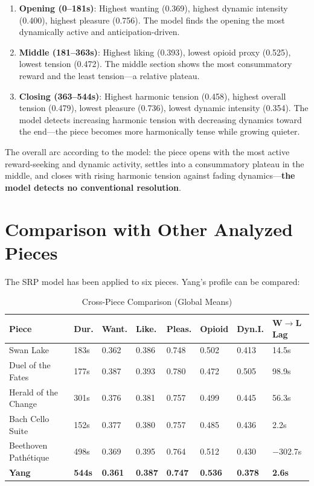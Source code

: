 \documentclass[11pt]{article}
\begin{document}
\begin{enumerate}
    \item \textbf{Opening (0--181s)}: Highest wanting (0.369), highest dynamic intensity (0.400), highest pleasure (0.756). The model finds the opening the most dynamically active and anticipation-driven.

    \item \textbf{Middle (181--363s)}: Highest liking (0.393), lowest opioid proxy (0.525), lowest tension (0.472). The middle section shows the most consummatory reward and the least tension---a relative plateau.

    \item \textbf{Closing (363--544s)}: Highest harmonic tension (0.458), highest overall tension (0.479), lowest pleasure (0.736), lowest dynamic intensity (0.354). The model detects increasing harmonic tension with decreasing dynamics toward the end---the piece becomes more harmonically tense while growing quieter.
\end{enumerate}

The overall arc according to the model: the piece opens with the most active reward-seeking and dynamic activity, settles into a consummatory plateau in the middle, and closes with rising harmonic tension against fading dynamics---\textbf{the model detects no conventional resolution}.

\section{Comparison with Other Analyzed Pieces}
\label{sec:comparison}

The SRP model has been applied to six pieces. Yang's profile can be compared:

\begin{table}[H]
\centering
\caption{Cross-Piece Comparison (Global Means)}
\small
\begin{tabular}{l R{1cm} R{1cm} R{1cm} R{1cm} R{1cm} R{1cm} R{1.2cm}}
\toprule
\textbf{Piece} & \textbf{Dur.} & \textbf{Want.} & \textbf{Like.} & \textbf{Pleas.} & \textbf{Opioid} & \textbf{Dyn.I.} & \textbf{W$\rightarrow$L Lag} \\
\midrule
Swan Lake & 183s & 0.362 & 0.386 & 0.748 & 0.502 & 0.413 & 14.5s \\
Duel of the Fates & 177s & 0.387 & 0.393 & 0.780 & 0.472 & 0.505 & 98.9s \\
Herald of the Change & 301s & 0.376 & 0.381 & 0.757 & 0.499 & 0.445 & 56.3s \\
Bach Cello Suite & 152s & 0.377 & 0.380 & 0.757 & 0.485 & 0.436 & 2.2s \\
Beethoven Path\'{e}tique & 498s & 0.369 & 0.395 & 0.764 & 0.512 & 0.430 & $-$302.7s \\
 \textbf{Yang} & \textbf{544s} & \textbf{0.361} & \textbf{0.387} & \textbf{0.747} & \textbf{0.536} & \textbf{0.378} & \textbf{2.6s} \\
\bottomrule
\end{tabular}
\end{table}
\end{document}
